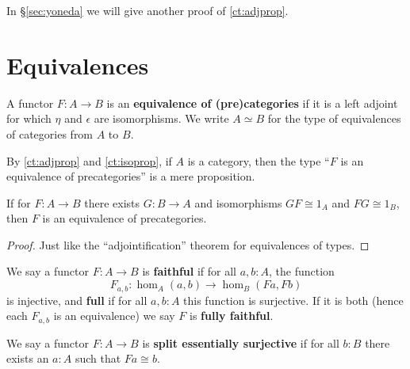 In \S\ref{sec:yoneda} we will give another proof of \autoref{ct:adjprop}.


\section{Equivalences}
\label{sec:equivalences}

\begin{defn}
  A functor $F:A\to B$ is an \textbf{equivalence of (pre)categories} if it is a left adjoint for which $\eta$ and $\epsilon$ are isomorphisms.
  We write $A\simeq B$ for the type of equivalences of categories from $A$ to $B$.
\end{defn}

By \autoref{ct:adjprop} and \autoref{ct:isoprop}, if $A$ is a category, then the type ``$F$ is an equivalence of precategories'' is a mere proposition.

\begin{lem}\label{ct:adjointification}
  If for $F:A\to B$ there exists $G:B\to A$ and isomorphisms $GF\cong 1_A$ and $FG\cong 1_B$, then $F$ is an equivalence of precategories.
\end{lem}
\begin{proof}
  Just like the ``adjointification'' theorem for equivalences of types.
\end{proof}

\begin{defn}
  We say a functor $F:A\to B$ is \textbf{faithful} if for all $a,b:A$, the function
  \[F_{a,b}:\hom_A(a,b) \to \hom_B(Fa,Fb)\]
  is injective, and \textbf{full} if for all $a,b:A$ this function is surjective.
  If it is both (hence each $F_{a,b}$ is an equivalence) we say $F$ is \textbf{fully faithful}.
\end{defn}

\begin{defn}
  We say a functor $F:A\to B$ is \textbf{split essentially surjective} if for all $b:B$ there exists an $a:A$ such that $Fa\cong b$.
\end{defn}

